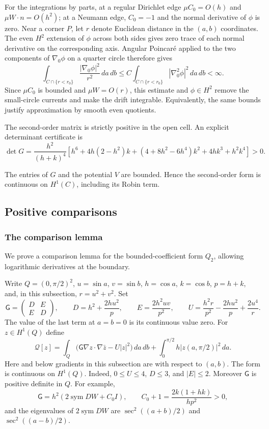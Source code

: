 \documentclass[reqno,11pt]{amsart}
\numberwithin{equation}{section}
\theoremstyle{remark}
\begin{document}
For the integrations by parts, at a regular Dirichlet edge
$\mu C_0=O(h)$ and $\mu W\cdot n=O(h^2)$; at a Neumann edge,
$C_0=-1$ and the normal derivative of $\phi$ is zero.
Near a corner $P$, let $r$ denote Euclidean distance in the $(a,b)$
coordinates. The even $H^2$ extension of $\phi$ across both sides
gives zero trace of each normal derivative on the corresponding axis.
Angular Poincar\'e applied to the two components of $\nabla_0\phi$
on a quarter circle therefore gives
\[
 \int_{C\cap\{r<r_0\}}\frac{|\nabla_0\phi|^2}{r^2}\,da\,db
 \leq C\int_{C\cap\{r<r_0\}}|\nabla_0^2\phi|^2\,da\,db<\infty.
\]
Since $\mu C_0$ is bounded and $\mu W=O(r)$, this estimate and
$\phi\in H^2$ remove the small-circle currents and make the drift
integrable. Equivalently, the same bounds justify approximation by
smooth even quotients.

The second-order matrix is strictly positive in the open cell.
An explicit determinant certificate is
\[
 \det G=\frac{h^2}{(h+k)^4}
 \left[h^6+4h(2-h^2)k+(4+8h^2-6h^4)k^2
                         +4hk^3+h^2k^4\right]>0.
\]

The entries of $G$ and the potential $V$ are bounded. Hence the
second-order form is continuous on $H^1(C)$, including its Robin term.


\subsection{Positive comparisons}

\subsubsection{The comparison lemma}

We prove a comparison lemma for the bounded-coefficient form $Q_2$,
allowing logarithmic derivatives at the boundary.

Write $Q=(0,\pi/2)^2$, $u=\sin a$, $v=\sin b$, $h=\cos a$,
$k=\cos b$, $p=h+k$, and, in this subsection, $r=u^2+v^2$. Set
\[
 \mathsf G=\begin{pmatrix}D&E\\E&D\end{pmatrix},\qquad
 D=h^2+\frac{2hu^2}{p},\qquad E=\frac{2h^2uv}{p^2},
 \qquad
 U=\frac{h^2r}{p^2}-\frac{2hu^2}{p}+\frac{2u^4}{r}.
\]
The value of the last term at $a=b=0$ is its continuous value zero.
For $z\in H^1(Q)$ define
\begin{equation}\label{eq:comparison-robin-form}
 \mathcal Q[z]=\int_Q
       \bigl(\mathsf G\nabla z\cdot\nabla\bar z-U|z|^2\bigr)
       \,da\,db
       +\int_0^{\pi/2}h|z(a,\pi/2)|^2\,da.
\end{equation}
Here and below gradients in this subsection are with respect to
$(a,b)$.  The form is continuous on $H^1(Q)$.  Indeed,
$0\leq U\leq4$, $D\leq3$, and $|E|\leq2$.
Moreover $\mathsf G$ is positive definite in $Q$.  For example,
\[
 \mathsf G=h^2(2\operatorname{sym}DW+C_0I),\qquad
 C_0+1=\frac{2k(1+hk)}{hp^2}>0,
\]
and the eigenvalues of $2\operatorname{sym}DW$ are
$\sec^2((a+b)/2)$ and $\sec^2((a-b)/2)$.
\end{document}
